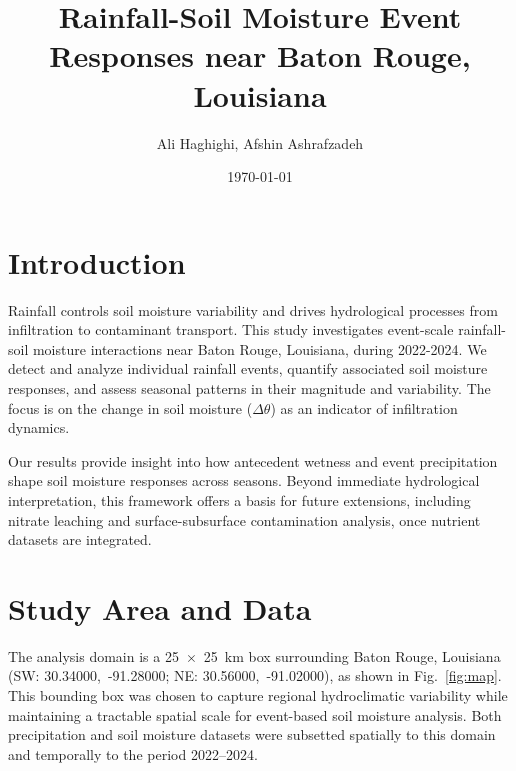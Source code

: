 \documentclass[twocolumn]{article}
\title{Rainfall-Soil Moisture Event Responses near Baton Rouge, Louisiana}
\author{Ali Haghighi, Afshin Ashrafzadeh}
\date{\today}
\makeatletter
\renewcommand{\maketitle}{\bgroup\setlength{\parindent}{0pt}
\begin{flushleft}
  \Large\textbf{\@title}
  
  \vspace{0.2cm}
  
  \normalsize\@author \hfill \normalsize\@date
  
  \vspace{0.25cm}
  \hrule
  
  \vspace{0.25cm}
\end{flushleft}\egroup
}
\makeatother
\begin{document}
\twocolumn[
  \begin{@twocolumnfalse}
    \maketitle
  \end{@twocolumnfalse}
]



\section*{Introduction}

Rainfall controls soil moisture variability and drives hydrological processes from infiltration to contaminant transport. This study investigates event-scale rainfall-soil moisture interactions near Baton Rouge, Louisiana, during 2022-2024. We detect and analyze individual rainfall events, quantify associated soil moisture responses, and assess seasonal patterns in their magnitude and variability. The focus is on the change in soil moisture ($\Delta \theta$) as an indicator of infiltration dynamics.

Our results provide insight into how antecedent wetness and event precipitation shape soil moisture responses across seasons. Beyond immediate hydrological interpretation, this framework offers a basis for future extensions, including nitrate leaching and surface-subsurface contamination analysis, once nutrient datasets are integrated.


\section*{Study Area and Data}

The analysis domain is a 25~$\times$~25~km box surrounding Baton Rouge, Louisiana (SW: 30.34000,~-91.28000; NE: 30.56000,~-91.02000), as shown in Fig.~\ref{fig:map}. This bounding box was chosen to capture regional hydroclimatic variability while maintaining a tractable spatial scale for event-based soil moisture analysis. Both precipitation and soil moisture datasets were subsetted spatially to this domain and temporally to the period 2022--2024.
\end{document}
